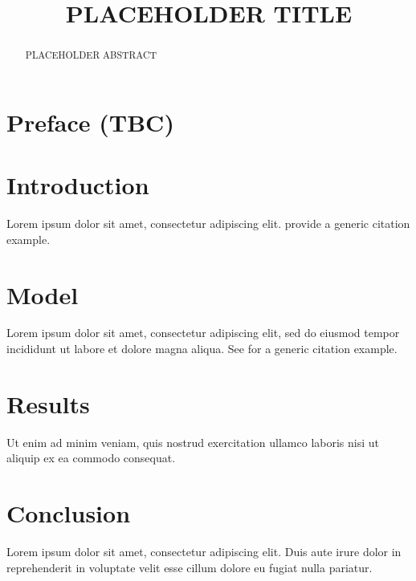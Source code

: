 \documentclass[12pt]{article}
\title{PLACEHOLDER TITLE}
\author{}
\date{}
\begin{document}
\maketitle
\thispagestyle{plain}

\begin{abstract}
PLACEHOLDER ABSTRACT
\end{abstract}

\section*{Preface (TBC)}
\vspace{-1.5em}

\section{Introduction}

Lorem ipsum dolor sit amet, consectetur adipiscing elit. \citet{authorYEAR1,authorYEAR2} provide a generic citation example.

\section{Model}

Lorem ipsum dolor sit amet, consectetur adipiscing elit, sed do eiusmod tempor incididunt ut labore et dolore magna aliqua. See \citet{authorYEAR1} for a generic citation example.

\section{Results}

Ut enim ad minim veniam, quis nostrud exercitation ullamco laboris nisi ut aliquip ex ea commodo consequat.

\section{Conclusion}

Lorem ipsum dolor sit amet, consectetur adipiscing elit. Duis aute irure dolor in reprehenderit in voluptate velit esse cillum dolore eu fugiat nulla pariatur.

\printbibliography
\end{document}
